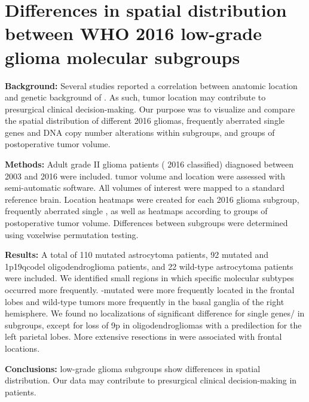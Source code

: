 
\chapter[Differences in spatial distribution between WHO 2016 low-grade glioma molecular subgroups][LGG location molecular subgroups]{Differences in spatial distribution between WHO 2016 low-grade glioma molecular subgroups}\label{chap:LGGLocation}



\begin{ChapterAbstract}
    \textbf{Background:} Several studies reported a correlation between anatomic location and genetic background of .
    As such, \gls{tumor} location may contribute to presurgical clinical decision-making.
    Our purpose was to visualize and compare the spatial distribution of different  2016 gliomas, frequently aberrated single genes and DNA copy number alterations within subgroups, and groups of postoperative \gls{tumor} volume.

    \textbf{Methods:}
    Adult grade II glioma patients ( 2016 classified) diagnosed between 2003 and 2016 were included.
    \Gls{tumor} volume and location were assessed with semi-automatic software.
    All volumes of interest were mapped to a standard reference brain.
    Location heatmaps were created for each  2016 glioma subgroup, frequently aberrated single , as well as heatmaps according to groups of postoperative \gls{tumor} volume.
    Differences between subgroups were determined using voxelwise permutation testing.

    \textbf{Results:}
    A total of 110  mutated astrocytoma patients, 92  mutated and \acl{1p19qcodel} oligodendroglioma patients, and 22  wild-type astrocytoma patients were included.
    We identified small regions in which specific molecular subtypes occurred more frequently.
    -mutated  were more frequently located in the frontal lobes and  wild-type \glspl{tumor} more frequently in the basal ganglia of the right hemisphere.
    We found no localizations of significant difference for single genes/ in subgroups, except for loss of 9p in oligodendrogliomas with a predilection for the left parietal lobes.
    More extensive resections in  were associated with frontal locations.

    \textbf{Conclusions:}
     low-grade glioma subgroups show differences in spatial distribution.
    Our data may contribute to presurgical clinical decision-making in  patients.

\end{ChapterAbstract}

